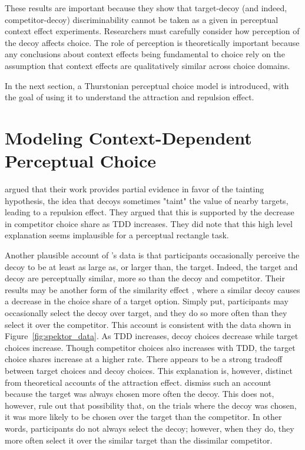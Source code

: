 These results are important because they show that target-decoy (and indeed, competitor-decoy) discriminability cannot be taken as a given in perceptual context effect experiments. Researchers must carefully consider how perception of the decoy affects choice. The role of perception is theoretically important because any conclusions about context effects being fundamental to choice \parencite{trueblood2013not} rely on the assumption that context effects are qualitatively similar across choice domains.

In the next section, a Thurstonian perceptual choice model is introduced, with the goal of using it to understand the attraction and repulsion effect. 

\section{Modeling Context-Dependent Perceptual Choice}

\textcite{spektorWhenGoodLooks2018b} argued that their work provides partial evidence in favor of the tainting hypothesis, the idea that decoys sometimes "taint" the value of nearby targets, leading to a repulsion effect. They argued that this is supported by the decrease in competitor choice share as TDD increases. They did note that this high level explanation seems implausible for a perceptual rectangle task.

Another plausible account of \textcite{spektorWhenGoodLooks2018b}'s data is that participants occasionally perceive the decoy to be at least as large as, or larger than, the target. Indeed, the target and decoy are perceptually similar, more so than the decoy and competitor. Their results may be another form of the similarity effect \parencite{tverskyEliminationAspectsTheory1972}, where a similar decoy causes a decrease in the choice share of a target option. Simply put, participants may occasionally select the decoy over target, and they do so more often than they select it over the competitor. This account is consistent with the data shown in Figure~\ref{fig:spektor_data}. As TDD increases, decoy choices decrease while target choices increase. Though competitor choices also increases with TDD, the target choice shares increase at a higher rate. There appears to be a strong tradeoff between target choices and decoy choices. This explanation is, however, distinct from theoretical accounts of the attraction effect. \textcite{spektorWhenGoodLooks2018b} dismiss such an account because the target was always chosen more often the decoy. This does not, however, rule out that possibility that, on the trials where the decoy was chosen, it was more likely to be chosen over the target than the competitor. In other words, participants do not always select the decoy; however, when they do, they more often select it over the similar target than the dissimilar competitor. 

